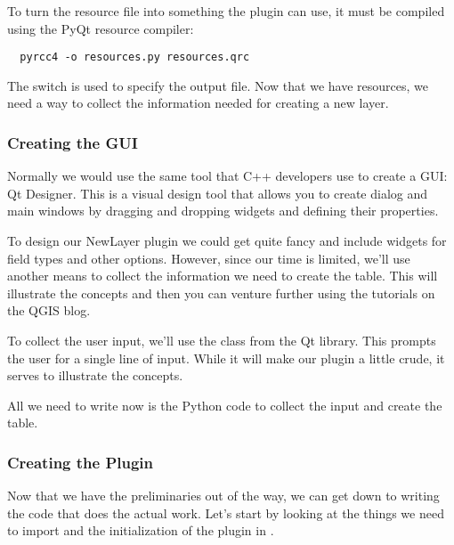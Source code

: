 To turn the resource file into something the plugin can use, it must be compiled using the PyQt resource compiler:

\begin{verbatim}
  pyrcc4 -o resources.py resources.qrc
\end{verbatim}

The  switch is used to specify the output file.
Now that we have resources, we need a way to collect the information needed for creating a new layer.

\subsubsection{Creating the GUI}

Normally we would use the same tool that C++ developers use to create a GUI: Qt Designer.
This is a visual design tool that allows you to create dialog and main windows by dragging and dropping widgets and defining their properties.

To design our NewLayer plugin we could get quite fancy and include widgets for field types and other options.
However, since our time is limited, we'll use another means to collect the information we need to create the table.
This will illustrate the concepts and then you can venture further using the tutorials on the QGIS blog.

To collect the user input, we'll use the  class from the Qt library.
This prompts the user for a single line of input.
While it will make our plugin a little crude, it serves to illustrate the concepts.

All we need to write now is the Python code to collect the input and create the table.

\subsubsection{Creating the Plugin}

Now that we have the preliminaries out of the way, we can get down to writing the code that does the actual work.
Let's start by looking at the things we need to import and the initialization of the plugin in .

